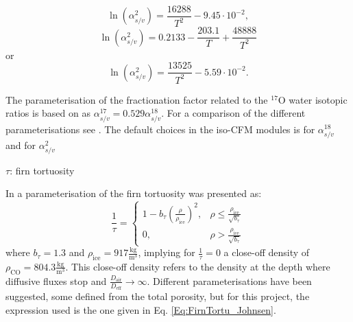 \documentclass[../../CompleteThesis/Complete_1stDraft.tex]{subfiles}
\begin{document}
\begin{equation}
	\ln(\alpha_{s/v}^{2}) = \frac{16288}{T^2} - 9.45\cdot 10^{-2},
	\label{Eq:FractFact2_Merlivat}
\end{equation}
\begin{equation}
	\ln(\alpha_{s/v}^{2}) = 0.2133 - \frac{203.1}{T} + \frac{48888}{T^2}
	\label{Eq:FractFact2_Ellehoj}
\end{equation}
or
\begin{equation}
	\ln(\alpha_{s/v}^{2}) =  \frac{13525}{T^2} - 5.59\cdot 10^{-2}.
	\label{Eq:FractFact2_Lamb}
\end{equation}

The parameterisation of the fractionation factor related to the $^{17}$O water isotopic ratios is based on \cite[Barkan and Luz, 2005]{BarkanLuz2005} as $\alpha_{s/v}^{17} = 0.529 \alpha_{s/v}^{18}$. For a comparison of the different parameterisations see \cite[Gkinis et al., 2021]{Gkinis2021}. The default choices in the iso-CFM modules is \cite[Majoube 1971]{Majoube1970} for $\alpha_{s/v}^{18}$ and \cite[Merlivat and Nief, 1967]{MerlivatNief1967} for $\alpha_{s/v}^{2}$

$\tau$: firn tortuosity

In \cite[Johnsen et al., 2000]{Johnsen2000} a parameterisation of the firn tortuosity was presented as:
\begin{equation}
	\frac{1}{\tau} = \begin{cases}
		1 - b_{\tau}\left(\frac{\rho}{\rho_{\text{ice}}}\right)^2,  & \rho \leq \frac{\rho_{\text{ice}}}{\sqrt{b_{\tau}}} \\
		0, & \rho > \frac{\rho_{\text{ice}}}{\sqrt{b_{\tau}}}
	\end{cases}
	\label{Eq:FirnTortu_Johnsen}
\end{equation}
where $b_{\tau} = 1.3$ and $\rho_{\text{ice}} = 917 \frac{\text{kg}}{\text{m}^3}$, implying for $\frac{1}{\tau}=0$ a close-off density of $\rho_{\text{CO}} = 804.3 \frac{\text{kg}}{\text{m}^3}$. This close-off density refers to the density at the depth where diffusive fluxes stop and $\frac{D_{\text{air}}}{D_{\text{eff}}}\rightarrow \infty$. Different parameterisations have been suggested, some defined from the total porosity, but for this project, the expression used is the one given in Eq. \ref{Eq:FirnTortu_Johnsen}.
\end{document}
